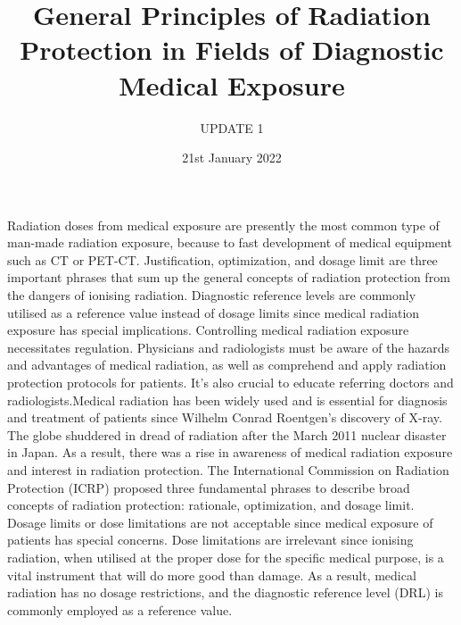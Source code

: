\documentclass[12pt]{article}
\title{ General Principles of Radiation Protection in Fields of Diagnostic Medical Exposure}
\author{UPDATE 1}
\date{21st January 2022}
\begin{document}
\maketitle
Radiation doses from medical exposure are presently the most common type of man-made radiation exposure, because to fast development of medical equipment such as CT or PET-CT. Justification, optimization, and dosage limit are three important phrases that sum up the general concepts of radiation protection from the dangers of ionising radiation. Diagnostic reference levels are commonly utilised as a reference value instead of dosage limits since medical radiation exposure has special implications. Controlling medical radiation exposure necessitates regulation. Physicians and radiologists must be aware of the hazards and advantages of medical radiation, as well as comprehend and apply radiation protection protocols for patients. It's also crucial to educate referring doctors and radiologists.Medical radiation has been widely used and is essential for diagnosis and treatment of patients since Wilhelm Conrad Roentgen's discovery of X-ray. The globe shuddered in dread of radiation after the March 2011 nuclear disaster in Japan. As a result, there was a rise in awareness of medical radiation exposure and interest in radiation protection.
The International Commission on Radiation Protection (ICRP) proposed three fundamental phrases to describe broad concepts of radiation protection: rationale, optimization, and dosage limit. Dosage limits or dose limitations are not acceptable since medical exposure of patients has special concerns. Dose limitations are irrelevant since ionising radiation, when utilised at the proper dose for the specific medical purpose, is a vital instrument that will do more good than damage. As a result, medical radiation has no dosage restrictions, and the diagnostic reference level (DRL) is commonly employed as a reference value.
\end{document}
